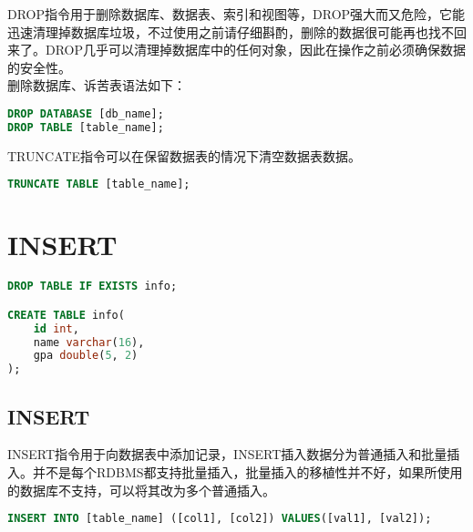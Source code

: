 \documentclass[12pt, openany, oneside]{book}
\begin{document}
DROP指令用于删除数据库、数据表、索引和视图等，DROP强大而又危险，它能迅速清理掉数据库垃圾，不过使用之前请仔细斟酌，删除的数据很可能再也找不回来了。DROP几乎可以清理掉数据库中的任何对象，因此在操作之前必须确保数据的安全性。\\

删除数据库、诉苦表语法如下：

\vspace{-0.5cm}

\begin{lstlisting}[language=SQL]
DROP DATABASE [db_name];
DROP TABLE [table_name];
\end{lstlisting}

TRUNCATE指令可以在保留数据表的情况下清空数据表数据。

\vspace{-0.5cm}

\begin{lstlisting}[language=SQL]
TRUNCATE TABLE [table_name];
\end{lstlisting}

\newpage

\chapter{INSERT}

\vspace{0.5cm}


\begin{lstlisting}[language=SQL]
DROP TABLE IF EXISTS info;

CREATE TABLE info(
    id int,
    name varchar(16),
    gpa double(5, 2)
);
\end{lstlisting}

\vspace{0.5cm}

\section{INSERT}

INSERT指令用于向数据表中添加记录，INSERT插入数据分为普通插入和批量插入。并不是每个RDBMS都支持批量插入，批量插入的移植性并不好，如果所使用的数据库不支持，可以将其改为多个普通插入。

\vspace{-0.5cm}

\begin{lstlisting}[language=SQL]
INSERT INTO [table_name] ([col1], [col2]) VALUES([val1], [val2]);
\end{lstlisting}
\end{document}
